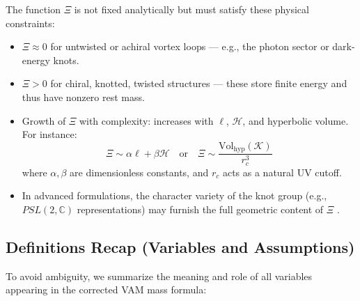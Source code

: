 \documentclass[11pt]{article}
\begin{document}
The function $\Xi$ is not fixed analytically but must satisfy these physical constraints:

\begin{itemize}
    \item $\Xi \approx 0$ for untwisted or achiral vortex loops — e.g., the photon sector or dark-energy knots.

    \item $\Xi > 0$ for chiral, knotted, twisted structures — these store finite energy and thus have nonzero rest mass.

    \item Growth of $\Xi$ with complexity: increases with $\ell$, $\mathcal{H}$, and hyperbolic volume. For instance:
    \[
        \Xi \sim \alpha \ell + \beta \mathcal{H} \quad\text{or}\quad
        \Xi \sim \frac{\mathrm{Vol}_{\mathrm{hyp}}(\mathcal{K})}{r_c^3}
    \]
    where $\alpha, \beta$ are dimensionless constants, and $r_c$ acts as a natural UV cutoff.

    \item In advanced formulations, the character variety of the knot group (e.g., $PSL(2,\mathbb{C})$ representations) may furnish the full geometric content of $\Xi$ \cite{Petersen2023}.
\end{itemize}

\bigskip
\subsection{Definitions Recap (Variables and Assumptions)}

To avoid ambiguity, we summarize the meaning and role of all variables appearing in the corrected VAM mass formula:
\end{document}
